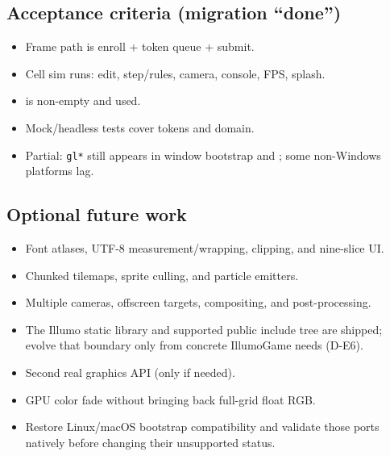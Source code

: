\subsection{Acceptance criteria (migration ``done'')}
\begin{itemize}
  \item[\checkmark] Frame path is enroll + token queue + submit.
  \item[\checkmark] Cell sim runs: edit, step/rules, camera, console, FPS, splash.
  \item[\checkmark]  is non-empty and used.
  \item[\checkmark] Mock/headless tests cover tokens and domain.
  \item Partial: \texttt{gl*} still appears in window bootstrap and
        ; some non-Windows platforms lag.
\end{itemize}

\subsection{Optional future work}
\begin{itemize}
  \item Font atlases, UTF-8 measurement/wrapping, clipping, and nine-slice UI.
  \item Chunked tilemaps, sprite culling, and particle emitters.
  \item Multiple cameras, offscreen targets, compositing, and post-processing.
  \item The Illumo static library and supported public include tree are shipped;
        evolve that boundary only from concrete IllumoGame needs (D-E6).
  \item Second real graphics API (only if needed).
  \item GPU color fade without bringing back full-grid float RGB.
  \item Restore Linux/macOS bootstrap compatibility and validate those ports
        natively before changing their unsupported status.
\end{itemize}

